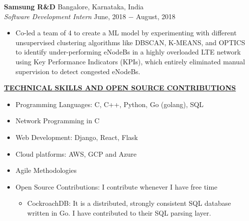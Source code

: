\documentclass{article}
\begin{document}
\noindent \textbf{Samsung R\&D} \hfill Bangalore, Karnataka, India \\
\textit{Software Development Intern} \hfill June, 2018 $-$ August, 2018
\begin{itemize}[noitemsep,nolistsep,leftmargin=*]
\item {Co-led a team of 4 to create a ML model by experimenting with different unsupervised clustering algorithms like DBSCAN, K-MEANS, and OPTICS to identify under-performing eNodeBs in a highly overloaded LTE network using Key Performance Indicators (KPIs), which entirely eliminated manual supervision to detect congested eNodeBs. \\}
\end{itemize}

\noindent \textbf{\underline{TECHNICAL SKILLS AND OPEN SOURCE CONTRIBUTIONS}}
\begin{itemize}[noitemsep,nolistsep,leftmargin=*]
\item {Programming Languages: C, C++, Python, Go (golang), SQL}
\item {Network Programming in C}
\item {Web Development: Django, React, Flask}
\item {Cloud platforms: AWS, GCP and Azure}
\item {Agile Methodologies}
\item {Open Source Contributions: I contribute whenever I have free time}
\begin{itemize}
    \item CockroachDB: It is a distributed, strongly consistent SQL database written in Go. I have contributed to their SQL parsing layer. \\
\end{itemize}
\end{itemize}

%
%
\end{document}
